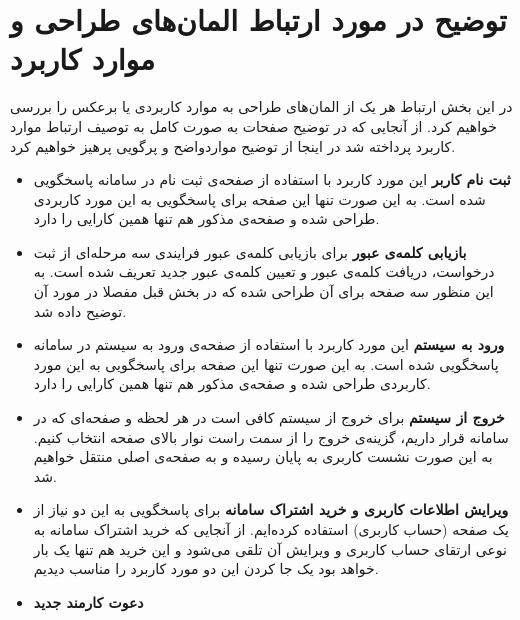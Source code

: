 
\section{توضیح در مورد ارتباط المان‌های طراحی و موارد کاربرد}

در این بخش ارتباط هر یک از المان‌های طراحی به موارد کاربردی یا برعکس را بررسی خواهیم کرد. از آنجایی که در توضیح صفحات به صورت کامل به توصیف ارتباط موارد کاربرد پرداخته شد در اینجا از توضیح مواردواضح و پرگویی پرهیز خواهیم  کرد.

\begin{itemize}
\item \textbf{ثبت نام کاربر} \newline
این مورد کاربرد با استفاده از صفحه‌ی ثبت نام در سامانه پاسخگویی شده است.
به این صورت تنها این صفحه برای پاسخگویی به این مورد کاربردی طراحی شده و صفحه‌ی مذکور هم تنها همین کارایی را دارد.
\item \textbf{بازیابی کلمه‌ی عبور} \newline
برای بازیابی کلمه‌ی عبور فرایندی سه مرحله‌ای از ثبت درخواست، دریافت کلمه‌ی عبور و تعیین کلمه‌ی عبور جدید تعریف شده است. به این منظور سه صفحه برای آن طراحی شده که در بخش قبل مفصلا در مورد آن توضیح داده شد.
\item \textbf{ورود به سیستم} \newline
این مورد کاربرد با استفاده از صفحه‌ی ورود به سیستم در سامانه پاسخگویی شده است.
به این صورت تنها این صفحه برای پاسخگویی به این مورد کاربردی طراحی شده و صفحه‌ی مذکور هم تنها همین کارایی را دارد.
\item \textbf{خروج از سیستم} \newline
برای خروج از سیستم کافی است در هر لحظه و صفحه‌ای که در سامانه قرار داریم، گزینه‌ی خروج را از سمت راست نوار بالای صفحه انتخاب کنیم. به این صورت نشست کاربری به پایان رسیده و به صفحه‌ی اصلی منتقل خواهیم شد.
\item \textbf{ویرایش اطلاعات کاربری و خرید اشتراک سامانه} \newline
برای پاسخگویی به این دو نیاز از یک صفحه (حساب کاربری) استفاده کرده‌ایم. از آنجایی که خرید اشتراک سامانه به نوعی ارتقای حساب کاربری و ویرایش آن تلقی می‌شود و این خرید هم تنها یک بار خواهد بود یک جا کردن این دو مورد کاربرد را مناسب دیدیم.
\item \textbf{دعوت کارمند جدید} \newline

\end{itemize}
